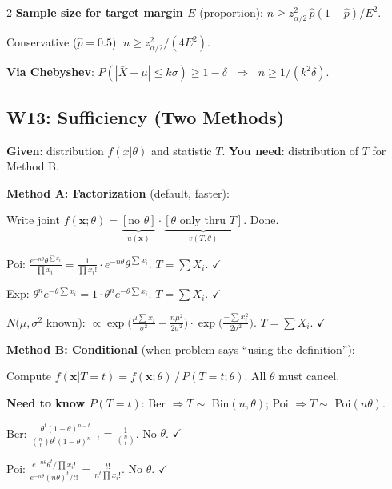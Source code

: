\documentclass[8pt]{extarticle}
\begin{document}
\begin{multicols}{2}
\textbf{Sample size for target margin $E$} (proportion): $n \ge z_{\alpha/2}^2\,\hat p(1{-}\hat p)/E^2$.

Conservative ($\hat p = 0.5$): $n \ge z_{\alpha/2}^2/(4E^2)$.

\textbf{Via Chebyshev}: $P(|\bar X - \mu|\le k\sigma) \ge 1-\delta$ $\;\Rightarrow\;$ $n \ge 1/(k^2\delta)$.

\subsection{W13: Sufficiency (Two Methods)}

\textbf{Given}: distribution $f(x|\theta)$ and statistic $T$. \textbf{You need}: distribution of $T$ for Method B.

\textbf{Method A: Factorization} (default, faster):

Write joint $f(\mathbf{x};\theta) = \underbrace{[\text{no }\theta]}_{u(\mathbf{x})} \cdot \underbrace{[\theta\text{ only thru }T]}_{v(T,\theta)}$. Done.

Poi: $\frac{e^{-n\theta}\theta^{\sum x_i}}{\prod x_i!} = \frac{1}{\prod x_i!}\cdot e^{-n\theta}\theta^{\sum x_i}$. $T=\sum X_i$. $\checkmark$

Exp: $\theta^n e^{-\theta\sum x_i} = 1 \cdot \theta^n e^{-\theta\sum x_i}$. $T=\sum X_i$. $\checkmark$

$N(\mu,\sigma^2$ known): $\propto \exp\!\big(\frac{\mu\sum x_i}{\sigma^2} - \frac{n\mu^2}{2\sigma^2}\big)\cdot\exp\!\big(\frac{-\sum x_i^2}{2\sigma^2}\big)$. $T=\sum X_i$. $\checkmark$

\medskip

\textbf{Method B: Conditional} (when problem says ``using the definition''):

Compute $f(\mathbf{x}|T{=}t) = f(\mathbf{x};\theta)\,/\,P(T{=}t;\theta)$. All $\theta$ must cancel.

\textbf{Need to know $P(T{=}t)$}: Ber $\Rightarrow T\sim$ Bin$(n,\theta)$; Poi $\Rightarrow T\sim$ Poi$(n\theta)$.

Ber: $\frac{\theta^t(1-\theta)^{n-t}}{\binom{n}{t}\theta^t(1-\theta)^{n-t}} = \frac{1}{\binom{n}{t}}$. No $\theta$. $\checkmark$

Poi: $\frac{e^{-n\theta}\theta^t/\prod x_i!}{e^{-n\theta}(n\theta)^t/t!} = \frac{t!}{n^t\prod x_i!}$. No $\theta$. $\checkmark$

\end{multicols}
\end{document}
